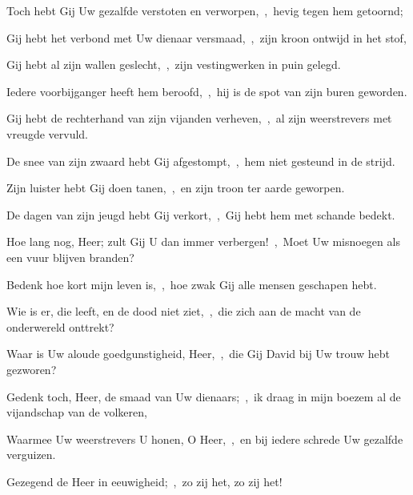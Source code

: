 \documentclass[12pt,twoside,a5paper]{article}
\begin{document}

\begin{halfparskip}
  Toch hebt Gij Uw gezalfde verstoten en verworpen,~\sep\ hevig tegen hem getoornd;

  Gij hebt het verbond met Uw dienaar versmaad,~\sep\ zijn kroon ontwijd in het stof,

  Gij hebt al zijn wallen geslecht,~\sep\ zijn vestingwerken in puin gelegd.

  Iedere voorbijganger heeft hem beroofd,~\sep\ hij is de spot van zijn buren geworden.

  Gij hebt de rechterhand van zijn vijanden verheven,~\sep\ al zijn weerstrevers met vreugde vervuld.

  De snee van zijn zwaard hebt Gij afgestompt,~\sep\ hem niet gesteund in de strijd.

  Zijn luister hebt Gij doen tanen,~\sep\ en zijn troon ter aarde geworpen.

  De dagen van zijn jeugd hebt Gij verkort,~\sep\ Gij hebt hem met schande bedekt.
\end{halfparskip}


\begin{halfparskip}
  Hoe lang nog, Heer; zult Gij U dan immer verbergen!~\sep\ Moet Uw misnoegen als een vuur blijven branden?

  Bedenk hoe kort mijn leven is,~\sep\ hoe zwak Gij alle mensen geschapen hebt.

  Wie is er, die leeft, en de dood niet ziet,~\sep\ die zich aan de macht van de onderwereld onttrekt?

  Waar is Uw aloude goedgunstigheid, Heer,~\sep\ die Gij David bij Uw trouw hebt gezworen?

  Gedenk toch, Heer, de smaad van Uw dienaars;~\sep\ ik draag in mijn boezem al de vijandschap van de volkeren,

  Waarmee Uw weerstrevers U honen, O Heer,~\sep\ en bij iedere schrede Uw gezalfde verguizen.

  Gezegend de Heer in eeuwigheid;~\sep\ zo zij het, zo zij het!
\end{halfparskip}

\end{document}
